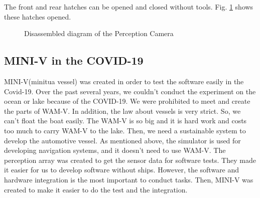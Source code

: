 \documentclass[lettersize,journal]{IEEEtran}
\begin{document}
The front and rear hatches can be opened and closed without tools. Fig. \ref{fig:camera_disassembly_1} shows these hatches opened.

\begin{figure}[htbp]
  \begin{center}
  \end{center}
  \caption{Disassembled diagram of the Perception Camera}
  \label{fig:camera_disassembly_1}
\end{figure}


\subsection{MINI-V in the COVID-19}
MINI-V(minitua vessel) was created in order to test the software easily in the Covid-19. Over the past several years, 
we couldn't conduct the experiment on the ocean or lake because of the COVID-19.
We were prohibited to meet and create the parts of WAM-V.
In addition, the law about vessels is very strict.
So, we can't float the boat easily. The WAM-V is so big and it is hard work and costs too much to carry WAM-V to the lake. 
Then, we need a sustainable system to develop the automotive vessel.
As mentioned above, the simulator is used for developing navigation systems, and it doesn't need to use WAM-V.
The perception array was created to get the sensor data for software tests. They made it easier for us to develop software without ships.
However, the software and hardware integration is the most important to conduct tasks. Then, MINI-V was created 
to make it easier to do the test and the integration.
\end{document}
